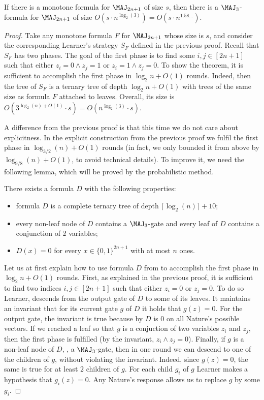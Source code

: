 \begin{theorem}
\label{transformation1}
If there is a monotone formula for $\MAJ_{2n + 1}$ of size $s$, then there is a $\MAJ_3$-formula for $\MAJ_{2n + 1}$ of size $O(s \cdot n^{\log_2(3)}) = O(s \cdot n^{1.58\ldots})$.
\end{theorem}
\begin{proof}
Take any monotone formula $F$ for $\MAJ_{2n + 1}$ whose size is $s$, and consider the corresponding Learner's strategy $S_F$ defined in the previous proof. Recall that $S_F$ has two phases. The goal of the first phase is to find some $i, j\in[2n + 1]$ such that either $z_i = 0\land z_j = 1$ or $z_i = 1\land z_j = 0$. To show the theorem, it is sufficient to accomplish the first phase in $\log_2 n + O(1)$ rounds. Indeed, then the tree of $S_F$ is a ternary tree of depth $\log_2 n  + O(1)$ with trees of the same size as formula $F$ attached to leaves. Overall, its size is $O(3^{\log_2(n) + O(1)} \cdot s) = O(n^{\log_2(3)} \cdot s)$. 

A difference from the previous proof is that this time we do not care about explicitness. In the explicit construction from the previous proof we fulfil the first phase in $\log_{3/2}(n) + O(1)$ rounds (in fact, we only bounded it from above by $\log_{9/8}(n) + O(1)$, to avoid technical details). To improve it, 
we need the following lemma, which will be proved by the probabilistic method.


\begin{lemma}
\label{valiant_lemma}
There exists a formula $D$ with the following properties:
\begin{itemize}
\item formula $D$ is a complete ternary tree of depth $\lceil\log_2(n)\rceil + 10$;
\item every non-leaf node of $D$ contains a $\MAJ_3$-gate and every leaf of $D$ contains a conjunction of 2 variables;
\item $D(x) = 0$ for every $x\in \{0, 1\}^{2n + 1}$ with at most $n$ ones.
\end{itemize}
\end{lemma}
Let us at first explain how to use formula $D$ from  to accomplish the first phase in $\log_2 n + O(1)$ rounds. First, as explained in the previous proof, it is sufficient to find two indices $i, j\in[2n + 1]$ such that either $z_i = 0$ or $z_j = 0$. To do so Learner, descends from the output gate of $D$ to some of its leaves. It %
 maintains an invariant that for its %
 current gate $g$ of $D$ it holds that $g(z) = 0$.  
For the output gate, the invariant is true because by  $D$ is $0$ on all Nature's possible vectors. If we reached a leaf so that $g$ is a conjuction of two variables $z_i$ and $z_j$, then the first phase is fulfilled (by the invariant, $z_i\land z_j = 0$). Finally, if $g$ is a non-leaf node of $D$, \ie, a $\MAJ_3$-gate, then in one round we can descend to one of the children of $g$, without violating the invariant. Indeed, since $g(z) = 0$, the same is true for at least $2$ children of $g$. For each child $g_i$ of $g$ Learner makes a hypothesis that $g_i(z) = 0$. Any Nature's response allows us to replace $g$ by some $g_i$. 


\end{proof}

